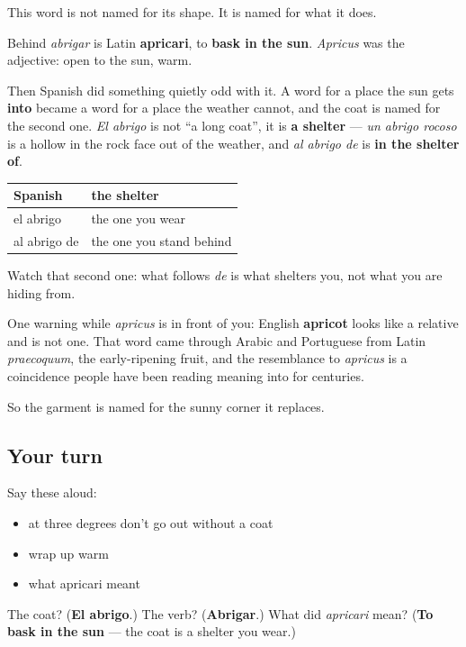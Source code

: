 \begin{cousinweb}
This word is not named for its shape. It is named for what it does.

Behind \emph{abrigar} is Latin \textbf{apricari}, to \textbf{bask in the sun}. \emph{Apricus} was the adjective: open to the sun, warm.

Then Spanish did something quietly odd with it. A word for a place the sun gets \textbf{into} became a word for a place the weather cannot, and the coat is named for the second one. \emph{El abrigo} is not \textquotedblleft{}a long coat\textquotedblright{}, it is \textbf{a shelter} — \emph{un abrigo rocoso} is a hollow in the rock face out of the weather, and \emph{al abrigo de} is \textbf{in the shelter of}.

\noindent
\begin{tabularx}{\linewidth}{@{}>{\raggedright\arraybackslash}X>{\raggedright\arraybackslash}X@{}}
\toprule
\textbf{Spanish} & \textbf{the shelter} \\
\midrule
el abrigo & the one you wear \\
al abrigo de & the one you stand behind \\
\bottomrule
\end{tabularx}

Watch that second one: what follows \emph{de} is what shelters you, not what you are hiding from.

One warning while \emph{apricus} is in front of you: English \textbf{apricot} looks like a relative and is not one. That word came through Arabic and Portuguese from Latin \emph{praecoquum}, the early-ripening fruit, and the resemblance to \emph{apricus} is a coincidence people have been reading meaning into for centuries.

So the garment is named for the sunny corner it replaces.
\end{cousinweb}

\subsection*{Your turn}
Say these aloud:

\begin{itemize}
\raggedright
  \item at three degrees don't go out without a coat
  \item wrap up warm
  \item what apricari meant
\end{itemize}

\begin{tcolorbox}[breakable,colback=teal!4,colframe=teal!35!black,title={Before you move on}]
The coat? (\textbf{El abrigo}.) The verb? (\textbf{Abrigar}.) What did \emph{apricari} mean? (\textbf{To bask in the sun} — the coat is a shelter you wear.)
\end{tcolorbox}
